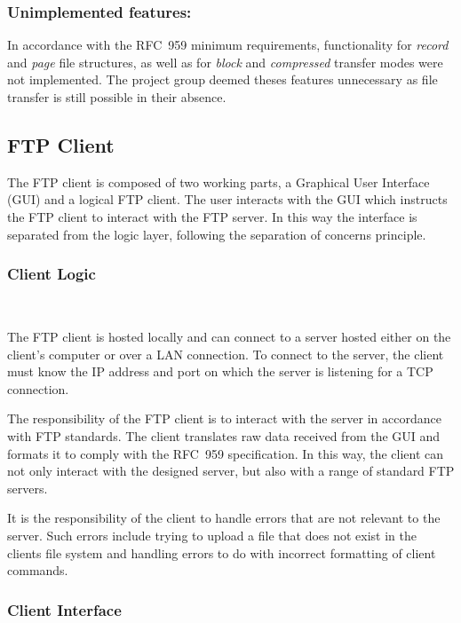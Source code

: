 \documentclass[10pt,twocolumn]{witseiepaper}
\begin{document}
\vspace*{-2mm}
\subsubsection*{Unimplemented features: }
In accordance with the RFC~959 minimum requirements, functionality for \textit{record} and \textit{page} file structures, as well as for \textit{block} and \textit{compressed} transfer modes were not implemented. The project group deemed theses features unnecessary as file transfer is still possible in their absence.

\subsection{FTP Client}

The FTP client is composed of two working parts, a Graphical User Interface (GUI) and a logical FTP client. The user interacts with the GUI which instructs the FTP client to interact with the FTP server. In this way the interface is separated from the logic layer, following the separation of concerns principle.

\vspace*{-2mm}
\subsubsection{Client Logic} $     $

The FTP client is hosted locally and can connect to a server hosted either on the client's computer or over a LAN connection. To connect to the server, the client must know the IP address and port on which the server is listening for a TCP connection.

The responsibility of the FTP client is to interact with the server in accordance with FTP standards. The client translates raw data received from the GUI and formats it to comply with the RFC~959 specification. In this way, the client can not only interact with the designed server, but also  with a range of standard FTP servers.

It is the responsibility of the client to handle errors that are not relevant to the server. Such errors include trying to upload a file that does not exist in the clients file system and handling errors to do with incorrect formatting of client commands.

\vspace*{-2mm}
\subsubsection{Client Interface} $      $\label{GUI}
\end{document}

